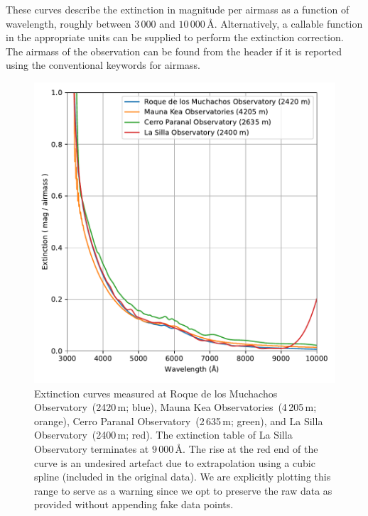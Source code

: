 \documentclass[linenumbers, twocolumn]{aastex631}
\begin{document}
These curves describe the extinction in magnitude per airmass as a function of wavelength,
roughly between $3\,000$ and $10\,000$\,\AA. Alternatively, a callable function
in the appropriate units can be supplied to perform the extinction correction.
The airmass of the observation can be found from the header if it is reported
using the conventional keywords for airmass.
\begin{figure}
    \centering
    \includegraphics[width=\columnwidth]{fig_07_extinction_curves.pdf}
    \caption{Extinction curves measured at Roque de los
    Muchachos Observatory~(2420\,m; blue), Mauna Kea Observatories~(4\,205\,m;
    orange), Cerro Paranal Observatory~(2\,635\,m; green), and La Silla
    Observatory~(2400\,m; red). The extinction table of La Silla Observatory
    terminates at $9\,000$\,\AA. The rise at the red end of the curve is an
    undesired artefact due to extrapolation using a cubic spline (included in the original data). We are
    explicitly plotting this range to serve as a warning since we opt to
    preserve the raw data as provided without appending fake data points.}
    \label{fig:extinction}
\end{figure}

\end{document}
